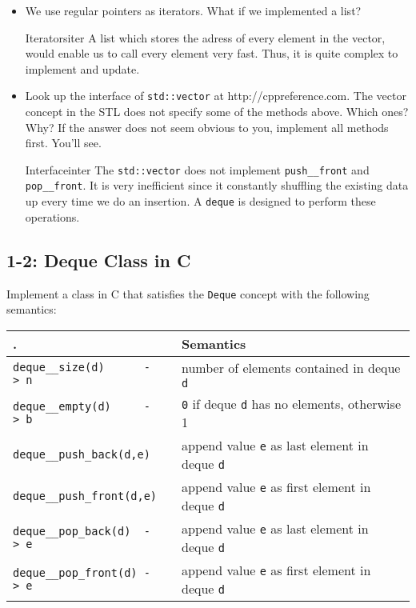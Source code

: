 \documentclass[]{article}
\providecommand{\tightlist}{%
  \setlength{\itemsep}{0pt}\setlength{\parskip}{0pt}}
\begin{document}
\begin{itemize}
\tightlist
\item
  We use regular pointers as iterators. What if we implemented a list?
    \begin{example}{Iterators}{iter}
        A list which stores the adress of every element in the vector, would
        enable us to call every element very fast. Thus, it is quite complex to
        implement and update.
    \end{example}

\item
  Look up the interface of \texttt{std::vector} at
  http://cppreference.com. The vector concept in the STL does not
  specify some of the methods above. Which ones? Why? If the answer does
  not seem obvious to you, implement all methods first. You'll see.
    \begin{example}{Interface}{inter}
        The \texttt{std::vector} does not implement \texttt{push\_\_front} and
        \texttt{pop\_\_front}. It is very inefficient since it constantly
        shuffling the existing data up every time we do an insertion. A
        \texttt{deque} is designed to perform these operations.
    \end{example}
\end{itemize}

\subsection{1-2: Deque Class in C}\label{deque-class-in-c}

Implement a class in C that satisfies the \texttt{Deque} concept with
the following semantics:

\begin{longtable}[c]{@{}ll@{}}
\toprule
. & Semantics \tabularnewline
\midrule
\endhead
\texttt{deque\_\_size(d)\ \ \ \ \ \ -\textgreater{}\ n} & number of
elements contained in deque \texttt{d}\tabularnewline
\texttt{deque\_\_empty(d)\ \ \ \ \ -\textgreater{}\ b} & \texttt{0} if
deque \texttt{d} has no elements, otherwise 1\tabularnewline
\texttt{deque\_\_push\_back(d,e)} & append value \texttt{e} as last
element in deque \texttt{d}\tabularnewline
\texttt{deque\_\_push\_front(d,e)} & append value \texttt{e} as first
element in deque \texttt{d}\tabularnewline
\texttt{deque\_\_pop\_back(d)\ \ -\textgreater{}\ e} & append value
\texttt{e} as last element in deque \texttt{d}\tabularnewline
\texttt{deque\_\_pop\_front(d)\ -\textgreater{}\ e} & append value
\texttt{e} as first element in deque \texttt{d}\tabularnewline
\bottomrule
\end{longtable}
\end{document}
